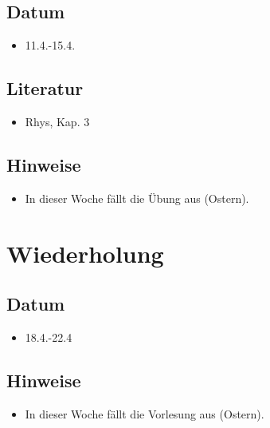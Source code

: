 \documentclass[
]{book}
\providecommand{\tightlist}{%
  \setlength{\itemsep}{0pt}\setlength{\parskip}{0pt}}
\begin{document}
\hypertarget{datum-4}{%
\subsection{Datum}\label{datum-4}}

\begin{itemize}
\tightlist
\item
  11.4.-15.4.
\end{itemize}

\hypertarget{literatur-5}{%
\subsection{Literatur}\label{literatur-5}}

\begin{itemize}
\tightlist
\item
  Rhys, Kap. 3
\end{itemize}

\hypertarget{hinweise-1}{%
\subsection{Hinweise}\label{hinweise-1}}

\begin{itemize}
\tightlist
\item
  In dieser Woche fällt die Übung aus (Ostern).
\end{itemize}

\hypertarget{wiederholung}{%
\section{Wiederholung}\label{wiederholung}}

\hypertarget{datum-5}{%
\subsection{Datum}\label{datum-5}}

\begin{itemize}
\tightlist
\item
  18.4.-22.4
\end{itemize}

\hypertarget{hinweise-2}{%
\subsection{Hinweise}\label{hinweise-2}}

\begin{itemize}
\tightlist
\item
  In dieser Woche fällt die Vorlesung aus (Ostern).
\end{itemize}
\end{document}

